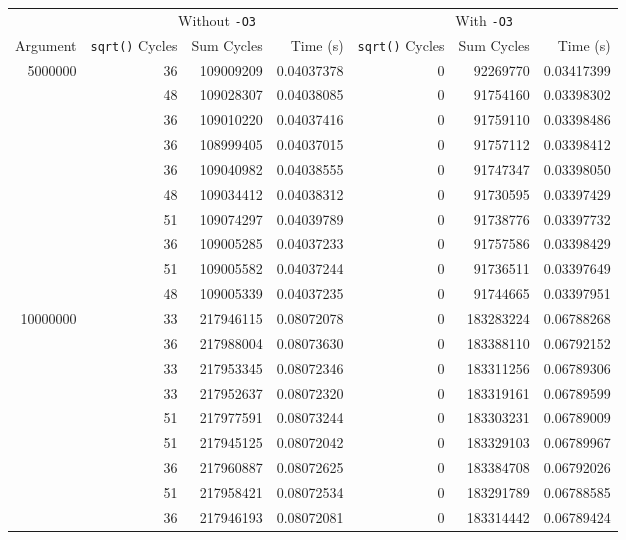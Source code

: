 \begin{tabular}{rrrrrrr}
\toprule
 & \multicolumn{3}{c}{Without \texttt{-O3}} 
 & \multicolumn{3}{c}{With \texttt{-O3}} \\
 \cmidrule(rl){2-4} \cmidrule(rl){5-7}
 Argument 
 & \texttt{sqrt()} Cycles & Sum Cycles & Time (s)
 & \texttt{sqrt()} Cycles & Sum Cycles & Time (s) \\
\midrule
  5000000 & 36 &   109009209 & 0.04037378 &  0 &    92269770 & 0.03417399 \\
          & 48 &   109028307 & 0.04038085 &  0 &    91754160 & 0.03398302 \\
          & 36 &   109010220 & 0.04037416 &  0 &    91759110 & 0.03398486 \\
          & 36 &   108999405 & 0.04037015 &  0 &    91757112 & 0.03398412 \\
          & 36 &   109040982 & 0.04038555 &  0 &    91747347 & 0.03398050 \\
          & 48 &   109034412 & 0.04038312 &  0 &    91730595 & 0.03397429 \\
          & 51 &   109074297 & 0.04039789 &  0 &    91738776 & 0.03397732 \\
          & 36 &   109005285 & 0.04037233 &  0 &    91757586 & 0.03398429 \\
          & 51 &   109005582 & 0.04037244 &  0 &    91736511 & 0.03397649 \\
          & 48 &   109005339 & 0.04037235 &  0 &    91744665 & 0.03397951 \\
\midrule
 10000000 & 33 &   217946115 & 0.08072078 &  0 &   183283224 & 0.06788268 \\
          & 36 &   217988004 & 0.08073630 &  0 &   183388110 & 0.06792152 \\
          & 33 &   217953345 & 0.08072346 &  0 &   183311256 & 0.06789306 \\
          & 33 &   217952637 & 0.08072320 &  0 &   183319161 & 0.06789599 \\
          & 51 &   217977591 & 0.08073244 &  0 &   183303231 & 0.06789009 \\
          & 51 &   217945125 & 0.08072042 &  0 &   183329103 & 0.06789967 \\
          & 36 &   217960887 & 0.08072625 &  0 &   183384708 & 0.06792026 \\
          & 51 &   217958421 & 0.08072534 &  0 &   183291789 & 0.06788585 \\
          & 36 &   217946193 & 0.08072081 &  0 &   183314442 & 0.06789424 \\

\end{tabular}
